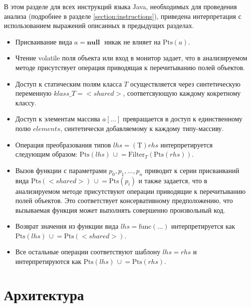 \documentclass[14pt,titlepage]{extarticle}
\newcommand{\NULL}{\textbf{null }}
\newcommand{\Pts}[1]{\textrm{Pts}(#1)}
\newcommand{\Filter}[2]{\textrm{Filter}_{#1}(#2)}
\newcommand{\cupe}{\,\cup\!\!=}
\newcommand{\eng}[1]{{\English#1}}
\let\oldsection\section
\renewcommand{\section}{\newpage\oldsection}
\begin{document}
      В этом разделе для всех инструкций языка Java, необходимых для проведения
      анализа (подробнее в разделе \ref{section:instructions}), приведена
      интерпретация с использованием выражений описанных в предыдущих разделах.
      \begin{itemize}
        \item Присваивание вида $a = \NULL$ никак не влияет на $\Pts{a}$.
        \item Чтение \eng{volatile} поля объекта или вход в монитор задает, что
              в анализируемом методе присутствует операция приводящая к
              перечитыванию полей объектов.
        \item Доступ к статическим полям класса $T$ осуществляется через
              синтетическую переменную $klass\_T = {<}shared{>}$,
              соответсвующую каждому кокретному классу.
        \item Доступ к элементам массива $a[\ldots]$ превращается в доступ к
              единственному полю $elements$, синтетически добавляемому к
              каждому типу-массиву.
        \item Операция преобразования типов $lhs = (\textrm{T})rhs$
              интерпретируется следующим образом:
              $\Pts{lhs} \cupe \Filter{T}{\Pts{rhs}}$.
        \item Вызов функции с параметрами $p_0, p_1, \ldots, p_n$ приводит к
              серии присваиваний вида $\Pts{{<}shared{>}} \cupe \Pts{p_i}$ и
              также задается, что в анализируемом методе присутствуют операции
              приводящие к перечитыванию полей объектов. Это соответствует
              консервативному предположению, что вызываемая функция может
              выполнять совершенно произвольный код.
        \item Возврат значения из функции вида
              $lhs = \textrm{func}(\ldots)$ интерпретируется как
              $\Pts{lhs} \cupe \Pts{{<}shared{>}}$.
        \item Все остальные операции соответствуют шаблону $lhs = rhs$ и
              интерпретируются как $\Pts{lhs} \cupe \Pts{rhs}$.
      \end{itemize}



  \section{Архитектура}
    \label{section:analysis_aux_ir}
\end{document}
